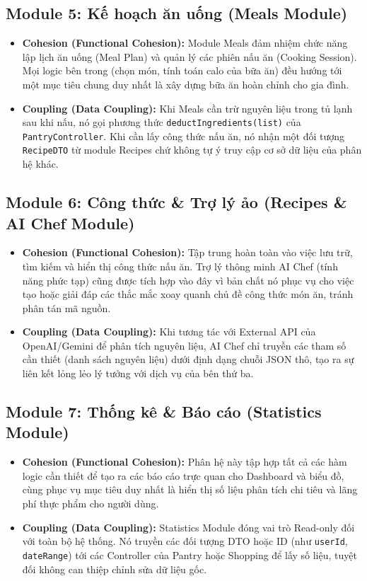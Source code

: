 \documentclass[12pt,a4paper]{article}
\begin{document}
\subsection{Module 5: Kế hoạch ăn uống (Meals Module)}
\begin{itemize}
    \item \textbf{Cohesion (Functional Cohesion):} Module Meals đảm nhiệm chức năng lập lịch ăn uống (Meal Plan) và quản lý các phiên nấu ăn (Cooking Session). Mọi logic bên trong (chọn món, tính toán calo của bữa ăn) đều hướng tới một mục tiêu chung duy nhất là xây dựng bữa ăn hoàn chỉnh cho gia đình.
    \item \textbf{Coupling (Data Coupling):} Khi Meals cần trừ nguyên liệu trong tủ lạnh sau khi nấu, nó gọi phương thức \texttt{deductIngredients(list)} của \texttt{PantryController}. Khi cần lấy công thức nấu ăn, nó nhận một đối tượng \texttt{RecipeDTO} từ module Recipes chứ không tự ý truy cập cơ sở dữ liệu của phân hệ khác.
\end{itemize}

\subsection{Module 6: Công thức \& Trợ lý ảo (Recipes \& AI Chef Module)}
\begin{itemize}
    \item \textbf{Cohesion (Functional Cohesion):} Tập trung hoàn toàn vào việc lưu trữ, tìm kiếm và hiển thị công thức nấu ăn. Trợ lý thông minh AI Chef (tính năng phức tạp) cũng được tích hợp vào đây vì bản chất nó phục vụ cho việc tạo hoặc giải đáp các thắc mắc xoay quanh chủ đề công thức món ăn, tránh phân tán mã nguồn.
    \item \textbf{Coupling (Data Coupling):} Khi tương tác với External API của OpenAI/Gemini để phân tích nguyên liệu, AI Chef chỉ truyền các tham số cần thiết (danh sách nguyên liệu) dưới định dạng chuỗi JSON thô, tạo ra sự liên kết lỏng lẻo lý tưởng với dịch vụ của bên thứ ba.
\end{itemize}

\subsection{Module 7: Thống kê \& Báo cáo (Statistics Module)}
\begin{itemize}
    \item \textbf{Cohesion (Functional Cohesion):} Phân hệ này tập hợp tất cả các hàm logic cần thiết để tạo ra các báo cáo trực quan cho Dashboard và biểu đồ, cùng phục vụ mục tiêu duy nhất là hiển thị số liệu phân tích chi tiêu và lãng phí thực phẩm cho người dùng.
    \item \textbf{Coupling (Data Coupling):} Statistics Module đóng vai trò Read-only đối với toàn bộ hệ thống. Nó truyền các đối tượng DTO hoặc ID (như \texttt{userId}, \texttt{dateRange}) tới các Controller của Pantry hoặc Shopping để lấy số liệu, tuyệt đối không can thiệp chỉnh sửa dữ liệu gốc.
\end{itemize}
\end{document}
